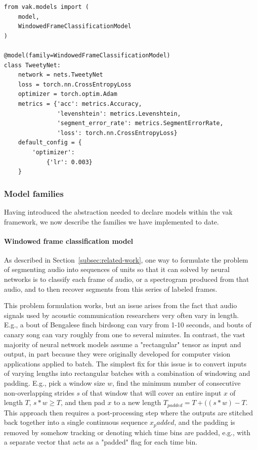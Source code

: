 \begin{verbatim}
from vak.models import (
    model,
    WindowedFrameClassificationModel
)

@model(family=WindowedFrameClassificationModel)
class TweetyNet:
    network = nets.TweetyNet
    loss = torch.nn.CrossEntropyLoss
    optimizer = torch.optim.Adam
    metrics = {'acc': metrics.Accuracy,
               'levenshtein': metrics.Levenshtein,
               'segment_error_rate': metrics.SegmentErrorRate,
               'loss': torch.nn.CrossEntropyLoss}
    default_config = {
        'optimizer':
            {'lr': 0.003}
    }
\end{verbatim}

\subsubsection{Model families \label{subsubsec:model-families}}

Having introduced the abstraction needed to declare models within the vak framework,
we now describe the families we have implemented to date.

\paragraph{Windowed frame classification model \label{p:windowed-frame-classification-model}}

As described in Section~\ref{subsec:related-work},
one way to formulate the problem of segmenting audio into sequences of units
so that it can solved by neural networks
is to classify each frame of audio, or a spectrogram produced from that audio,
and to then recover segments from this series of labeled frames.

This problem formulation works,
but an issue arises from the fact that audio signals used by acoustic communication
researchers very often vary in length.
E.g., a bout of Bengalese finch birdsong can vary from 1-10 seconds,
and bouts of canary song can vary roughly from one to several minutes.
In contrast, the vast majority of neural network models assume a "rectangular" tensor as input and output,
in part because they were originally developed for computer vision applications applied to batch.
The simplest fix for this issue is to convert inputs of varying lengths into rectangular batches with a combination of windowing and padding.
E.g., pick a window size $w$, find the minimum number of consecutive non-overlapping strides $s$ of that window that will cover an entire input $x$ of length $T$, $s * w \ge T$, and then pad $x$ to a new length $T_{padded} = T + ((s * w) - T$.
This approach then requires a post-processing step where the outputs are stitched back together into a single continuous sequence $x_padded$, and the padding is removed by somehow tracking or denoting which time bins are padded, e.g., with a separate vector that acts as a "padded" flag for each time bin.

